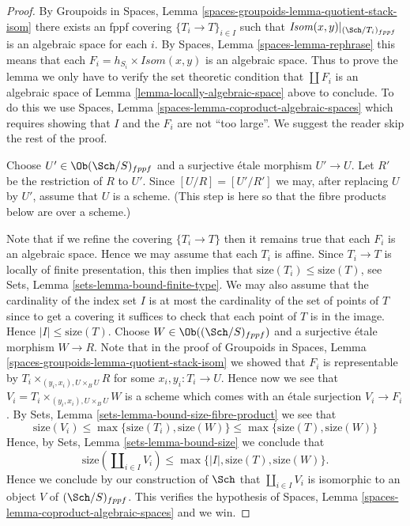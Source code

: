 \begin{proof}
By
Groupoids in Spaces,
Lemma \ref{spaces-groupoids-lemma-quotient-stack-isom}
there exists an fppf covering $\{T_i \to T\}_{i \in I}$
such that $\mathit{Isom}(x, y)|_{(\Sch/T_i)_{fppf}}$
is an algebraic space for each $i$. By
Spaces, Lemma \ref{spaces-lemma-rephrase}
this means that each $F_i = h_{S_i} \times \mathit{Isom}(x, y)$
is an algebraic space.
Thus to prove the lemma we only have to verify the set theoretic condition
that $\coprod F_i$ is an algebraic space of
Lemma \ref{lemma-locally-algebraic-space}
above to conclude. To do this we use
Spaces, Lemma \ref{spaces-lemma-coproduct-algebraic-spaces}
which requires showing that $I$ and the $F_i$ are not ``too large''.
We suggest the reader skip the rest of the proof.

\medskip\noindent
Choose $U' \in \Ob(\Sch/S)_{fppf}$ and a surjective
\'etale morphism $U' \to U$. Let $R'$ be the restriction of $R$ to $U'$.
Since $[U/R] = [U'/R']$ we may, after replacing $U$ by $U'$,
assume that $U$ is a scheme. (This step is here so that the
fibre products below are over a scheme.)

\medskip\noindent
Note that if we refine the covering $\{T_i \to T\}$ then it remains
true that each $F_i$ is an algebraic space.
Hence we may assume that each $T_i$ is affine. Since
$T_i \to T$ is locally of finite presentation, this then implies that
$\text{size}(T_i) \leq \text{size}(T)$, see
Sets, Lemma \ref{sets-lemma-bound-finite-type}.
We may also assume that the cardinality of the index set $I$ is at most the
cardinality of the set of points of $T$ since to get a
covering it suffices to check that each point of $T$ is in the image.
Hence $|I| \leq \text{size}(T)$.
Choose $W \in \Ob((\Sch/S)_{fppf})$
and a surjective \'etale morphism $W \to R$. Note that in the proof of
Groupoids in Spaces,
Lemma \ref{spaces-groupoids-lemma-quotient-stack-isom}
we showed that $F_i$ is representable by
$T_i \times_{(y_i, x_i), U \times_B U} R$ for some
$x_i, y_i : T_i \to U$. Hence now we see that
$V_i = T_i \times_{(y_i, x_i), U \times_B U} W$ is a
scheme which comes with an \'etale surjection $V_i \to F_i$.
By
Sets, Lemma \ref{sets-lemma-bound-size-fibre-product}
we see that
$$
\text{size}(V_i) \leq \max\{\text{size}(T_i), \text{size}(W)\}
\leq \max\{\text{size}(T), \text{size}(W)\}
$$
Hence, by
Sets, Lemma \ref{sets-lemma-bound-size}
we conclude that
$$
\text{size}(\coprod\nolimits_{i \in I} V_i)
\leq \max\{|I|, \text{size}(T), \text{size}(W)\}.
$$
Hence we conclude by our construction of $\Sch$
that $\coprod_{i \in I} V_i$ is isomorphic to an object
$V$ of $(\Sch/S)_{fppf}$. This verifies the
hypothesis of
Spaces, Lemma \ref{spaces-lemma-coproduct-algebraic-spaces}
and we win.
\end{proof}

